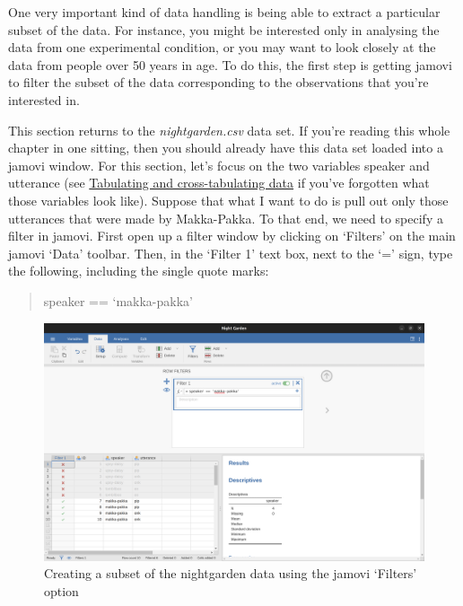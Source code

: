 \documentclass[
  a4paper,
]{book}
\begin{document}
One very important kind of data handling is being able to extract a
particular subset of the data. For instance, you might be interested
only in analysing the data from one experimental condition, or you may
want to look closely at the data from people over 50 years in age. To do
this, the first step is getting jamovi to filter the subset of the data
corresponding to the observations that you're interested in.

This section returns to the \emph{nightgarden.csv} data set. If you're
reading this whole chapter in one sitting, then you should already have
this data set loaded into a jamovi window. For this section, let's focus
on the two variables speaker and utterance (see
\protect\hyperlink{sec-Tabulating-and-cross-tabulating-data}{Tabulating
and cross-tabulating data} if you've forgotten what those variables look
like). Suppose that what I want to do is pull out only those utterances
that were made by Makka-Pakka. To that end, we need to specify a filter
in jamovi. First open up a filter window by clicking on `Filters' on the
main jamovi `Data' toolbar. Then, in the `Filter 1' text box, next to
the `=' sign, type the following, including the single quote marks:

\begin{quote}
speaker == `makka-pakka'
\end{quote}

\begin{figure}

\includegraphics[width=1\textwidth,height=\textheight]{images/fig6-10.png} \hfill{}

\caption{\label{fig-fig6-10}Creating a subset of the nightgarden data
using the jamovi `Filters' option}

\end{figure}
\end{document}
